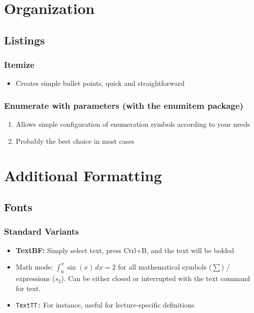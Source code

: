 \documentclass{scrartcl}
\author{\myauthor}
\title{\mytitle}
\subtitle{\mysubtitle}
\begin{document}

\maketitle
\thispagestyle{empty} %
\tableofcontents  %
\thispagestyle{empty} %
\newpage
\setcounter{page}{1}

\section{Organization}
  \subsection{Listings}
    \subsubsection{Itemize}
      \begin{itemize}
        \item Creates simple bullet points, quick and straightforward
      \end{itemize}
    \subsubsection{Enumerate with parameters (with the enumitem package)}
      \begin{enumerate}[label=\alph*)]
        \item Allows simple configuration of enumeration symbols according to
              your needs
        \item Probably the best choice in most cases
      \end{enumerate}

\section{Additional Formatting}
  \subsection{Fonts}
    \subsubsection{Standard Variants}
      \begin{itemize}
        \item \textbf{TextBF:} Simply select text, press Ctrl+B, and the text will be bolded
        \item $\text{Math mode: } \int_{0}^{\pi} \sin(x) \, dx = 2$ for all mathematical symbols ($\sum$) / expressions ($s_2$). Can be either closed or interrupted with the text command for text.
        \item \texttt{TextTT:} For instance, useful for lecture-specific definitions
      \end{itemize}
\end{document}

